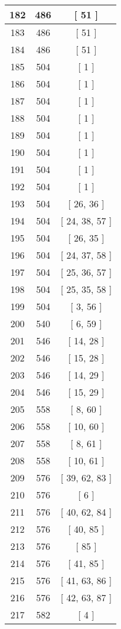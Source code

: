 \begin{center}
\begin{longtable}[H]{|| c c c ||}
\hline
182 & 486 & [ 51 ] \\ 
\hline
183 & 486 & [ 51 ] \\ 
\hline
184 & 486 & [ 51 ] \\ 
\hline
185 & 504 & [ 1 ] \\ 
\hline
186 & 504 & [ 1 ] \\ 
\hline
187 & 504 & [ 1 ] \\ 
\hline
188 & 504 & [ 1 ] \\ 
\hline
189 & 504 & [ 1 ] \\ 
\hline
190 & 504 & [ 1 ] \\ 
\hline
191 & 504 & [ 1 ] \\ 
\hline
192 & 504 & [ 1 ] \\ 
\hline
193 & 504 & [ 26, 36 ] \\ 
\hline
194 & 504 & [ 24, 38, 57 ] \\ 
\hline
195 & 504 & [ 26, 35 ] \\ 
\hline
196 & 504 & [ 24, 37, 58 ] \\ 
\hline
197 & 504 & [ 25, 36, 57 ] \\ 
\hline
198 & 504 & [ 25, 35, 58 ] \\ 
\hline
199 & 504 & [ 3, 56 ] \\ 
\hline
200 & 540 & [ 6, 59 ] \\ 
\hline
201 & 546 & [ 14, 28 ] \\ 
\hline
202 & 546 & [ 15, 28 ] \\ 
\hline
203 & 546 & [ 14, 29 ] \\ 
\hline
204 & 546 & [ 15, 29 ] \\ 
\hline
205 & 558 & [ 8, 60 ] \\ 
\hline
206 & 558 & [ 10, 60 ] \\ 
\hline
207 & 558 & [ 8, 61 ] \\ 
\hline
208 & 558 & [ 10, 61 ] \\ 
\hline
209 & 576 & [ 39, 62, 83 ] \\ 
\hline
210 & 576 & [ 6 ] \\ 
\hline
211 & 576 & [ 40, 62, 84 ] \\ 
\hline
212 & 576 & [ 40, 85 ] \\ 
\hline
213 & 576 & [ 85 ] \\ 
\hline
214 & 576 & [ 41, 85 ] \\ 
\hline
215 & 576 & [ 41, 63, 86 ] \\ 
\hline
216 & 576 & [ 42, 63, 87 ] \\ 
\hline
217 & 582 & [ 4 ] \\ 

\end{longtable}
\end{center}
